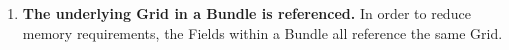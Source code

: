 

\begin{enumerate}

\item {\bf The underlying Grid in a Bundle is referenced.}  In order to
reduce memory requirements, the Fields within a Bundle all reference
the same Grid. 

\end{enumerate}



